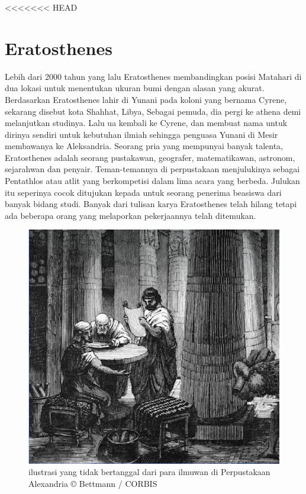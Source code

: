 <<<<<<< HEAD

\section{Eratosthenes}
Lebih dari 2000 tahun yang lalu Eratosthenes membandingkan posisi Matahari di dua lokasi untuk menentukan ukuran bumi dengan alasan yang akurat.
Berdasarkan \cite{plochmann1983dictionary} Eratosthenes lahir di Yunani pada koloni yang bernama Cyrene, sekarang disebut kota Shahhat, Libya, Sebagai pemuda, dia  pergi ke athena demi melanjutkan studinya. Lalu ua kembali ke Cyrene, dan membuat nama untuk dirinya sendiri untuk kebutuhan ilmiah sehingga penguasa Yunani di Mesir membawanya ke Aleksandria.
Seorang pria yang mempunyai banyak talenta, Eratosthenes adalah seorang pustakawan, geografer, matematikawan, astronom, sejarahwan dan penyair. Teman-temannya di perpustakaan menjulukinya sebagai Pentathlos atau atlit yang berkompetisi dalam lima acara yang berbeda. Julukan itu seperinya cocok ditujukan kepada untuk seorang penerima beasiswa dari banyak bidang studi. Banyak dari tulisan karya Eratosthenes telah hilang tetapi ada beberapa orang yang melaporkan pekerjaannya telah ditemukan. \cite{lasky2008librarian}
\begin{figure}[ht]
	\centerline{\includegraphics[width=1\textwidth]{figures/illustrasi.jpg}}
	\caption{ilustrasi yang tidak bertanggal dari para ilmuwan di Perpustakaan Alexandria © Bettmann / CORBIS}
	\label{illustrasi}
	\end{figure}
